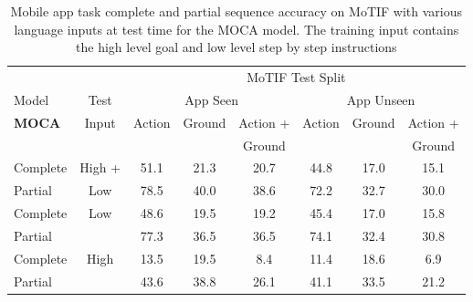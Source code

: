 \begin{table}[t]
    \centering
          \renewcommand\arraystretch{0.95}

        \caption{Mobile app task complete and partial sequence accuracy on MoTIF with various language inputs at test time for the MOCA model. The training input contains the high level goal and low level step by step instructions }
    \begin{tabular}{|l|c|c|c|c|c|c|c|}
    \hline
    & & \multicolumn{6}{c|}{MoTIF Test Split}\\
    \cline{3-8}
      Model & Test & \multicolumn{3}{c|}{App Seen} & \multicolumn{3}{c|}{App Unseen}\\
    \cline{3-8}
  \textbf{MOCA} & Input & \multirow{2}{*}{Action} & \multirow{2}{*}{Ground} & Action + &  \multirow{2}{*}{Action} & \multirow{2}{*}{Ground} & Action +\\
   & & & & Ground& & & Ground\\
    \hline
    Complete & High + & 51.1 & 21.3 & 20.7 & 44.8 & 17.0 & 15.1 \\ 
    Partial & Low & 78.5 & 40.0 & 38.6 & 72.2 & 32.7 & 30.0 \\
    \hline
    Complete &\multirow{2}{*}{Low} & 48.6 & 19.5 & 19.2 & 45.4 & 17.0 & 15.8\\
    Partial & & 77.3 & 36.5 & 36.5 & 74.1 & 32.4 & 30.8 \\ 
    \hline
    Complete & \multirow{2}{*}{High}&  13.5 & 19.5 & 8.4 & 11.4 & 18.6 & 6.9\\ 
    Partial & & 43.6 & 38.8 & 26.1 & 41.1 & 33.5 &21.2 \\
    \hline
    \end{tabular}
    \label{tab:automate_eval2}
\end{table}

